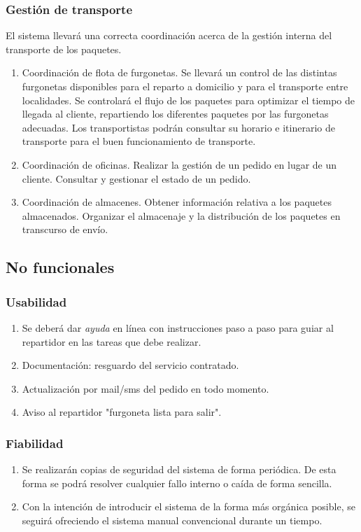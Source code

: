 \subsubsection{Gestión de transporte}
El sistema llevará una correcta coordinación acerca de la gestión interna del transporte de los paquetes.
\begin{enumerate}
	\item Coordinación de flota de furgonetas.
	\subitem Se llevará un control de las distintas furgonetas disponibles para el reparto a domicilio y para el transporte entre localidades.
	\subitem Se controlará el flujo de los paquetes para optimizar el tiempo de llegada al cliente, repartiendo los diferentes
 paquetes por las furgonetas adecuadas.
 	\subitem Los transportistas podrán consultar su horario e itinerario de transporte para el buen funcionamiento de transporte.

	\item Coordinación de oficinas.
	\subitem Realizar la gestión de un pedido en lugar de un cliente.
	\subitem Consultar y gestionar el estado de un pedido.
	
	\item Coordinación de almacenes.
	\subitem Obtener información relativa a los paquetes almacenados.
	\subitem Organizar el almacenaje y la distribución de los paquetes en transcurso de envío.


\end{enumerate}

\subsection{No funcionales}
\subsubsection{Usabilidad}
\begin{enumerate}
	\item Se deberá dar \textit{ayuda} en línea con instrucciones paso a paso para guiar al repartidor en las tareas que debe realizar.
	\item Documentación: resguardo del servicio contratado.
	\item Actualización por mail/sms del pedido en todo momento.
	\item Aviso al repartidor "furgoneta lista para salir".
	
\end{enumerate}
\subsubsection{Fiabilidad}
\begin{enumerate}
	\item Se realizarán copias de seguridad del sistema de forma periódica. De esta forma se podrá resolver cualquier fallo interno o caída de forma sencilla.
	\item Con la intención de introducir el sistema de la forma más orgánica posible, se seguirá ofreciendo el sistema manual convencional durante un tiempo.
\end{enumerate}

